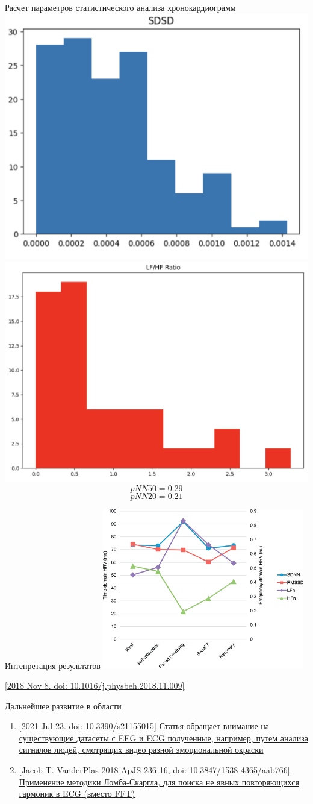 \documentclass[xcolor=table]{beamer}
\begin{document}
\begin{frame}{Расчет параметров статистического анализа хронокардиограмм}
    \centering
    \includegraphics[height= 4.2 cm]{SDSD.png}
    \includegraphics[height= 4.2 cm]{LF_HF.jpg}
    $$pNN50 = 0.29$$
    $$pNN20 = 0.21$$
\end{frame}

\begin{frame}{Интепретация результатов}
\centering
\includegraphics[height=7cm]{images/nihms-1022910-f0001.jpg}
\vspace{5}

\small \href{https://www.ncbi.nlm.nih.gov/pmc/articles/PMC6492031/}{[2018 Nov 8. doi: 10.1016/j.physbeh.2018.11.009]}
\end{frame}


\begin{frame}{Дальнейшее развитие в области}
\begin{enumerate} 
    \item \href{https://www.ncbi.nlm.nih.gov/pmc/articles/PMC8348698/}{[2021 Jul 23. doi: 10.3390/s21155015] Статья обращает внимание на существующие датасеты с EEG и ECG полученные, например, путем анализа сигналов людей, смотрящих видео разной эмоциональной окраски}
    \item \href{https://iopscience.iop.org/article/10.3847/1538-4365/aab766}{[Jacob T. VanderPlas 2018 ApJS 236 16, doi: 10.3847/1538-4365/aab766] Применение методики Ломба-Скаргла, для поиска не явных повторяющихся гармоник в ECG (вместо FFT)}
\end{enumerate}
    
\end{frame}
\end{document}
